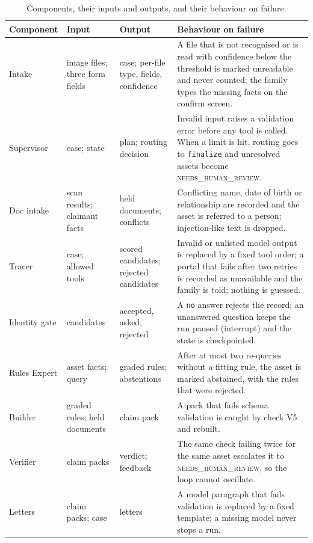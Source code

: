 \documentclass[12pt,a4paper,oneside]{report}
\begin{document}
\begin{table}[H]
\centering\footnotesize{}
\caption[Components and failure behaviour]{Components, their inputs and outputs, and their behaviour on failure.}\label{tab:components}
\renewcommand{\arraystretch}{1.1}
\begin{tabularx}{\linewidth}{@{}p{1.9cm}p{3.2cm}p{2.9cm}X@{}}
\toprule
\textbf{Component} & \textbf{Input} & \textbf{Output} & \textbf{Behaviour on failure} \\ \midrule
Intake & image files; three form fields & case; per-file type, fields, confidence & A file that is not recognised or is read with confidence below the threshold is marked unreadable and never counted; the family types the missing facts on the confirm screen. \\
Supervisor & case; state & plan; routing decision & Invalid input raises a validation error before any tool is called. When a limit is hit, routing goes to \texttt{finalize} and unresolved assets become \textsc{needs\_human\_review}. \\
Doc intake & scan results; claimant facts & held documents; conflicts & Conflicting name, date of birth or relationship are recorded and the asset is referred to a person; injection-like text is dropped. \\
Tracer & case; allowed tools & scored candidates; rejected candidates & Invalid or unlisted model output is replaced by a fixed tool order; a portal that fails after two retries is recorded as unavailable and the family is told; nothing is guessed. \\
Identity gate & candidates & accepted, asked, rejected & A \texttt{no} answer rejects the record; an unanswered question keeps the run paused (interrupt) and the state is checkpointed. \\
Rules Expert & asset facts; query & graded rules; abstentions & After at most two re-queries without a fitting rule, the asset is marked abstained, with the rules that were rejected. \\
Builder & graded rules; held documents & claim pack & A pack that fails schema validation is caught by check V5 and rebuilt. \\
Verifier & claim packs & verdict; feedback & The same check failing twice for the same asset escalates it to \textsc{needs\_human\_review}, so the loop cannot oscillate. \\
Letters & claim packs; case & letters & A model paragraph that fails validation is replaced by a fixed template; a missing model never stops a run. \\ \bottomrule
\end{tabularx}
\end{table}
\end{document}
